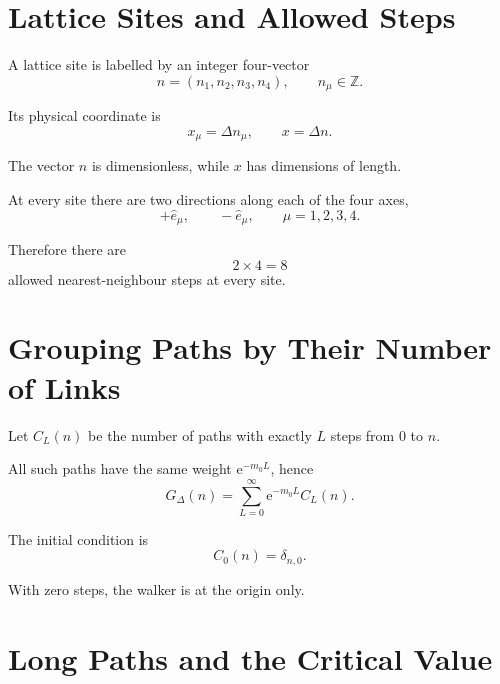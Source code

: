 \documentclass[11pt,a4paper,oneside]{article}
\newcommand{\ee}{\mathrm{e}}
\begin{document}
	\section{Lattice Sites and Allowed Steps}
	
	A lattice site is labelled by an integer four-vector
	\begin{equation}
		n=(n_1,n_2,n_3,n_4),
		\qquad
		n_\mu\in\mathbb{Z}.
	\end{equation}
	
	Its physical coordinate is
	\begin{equation}
		x_\mu=\Delta n_\mu,
		\qquad
		x=\Delta n.
		\label{eq:x-delta-n}
	\end{equation}
	
	The vector $n$ is dimensionless, while $x$ has dimensions of length.
	
	At every site there are two directions along each of the four axes,
	\[
	+\hat e_\mu,
	\qquad
	-\hat e_\mu,
	\qquad
	\mu=1,2,3,4.
	\]
	
	Therefore there are
	\[
	2\times4=8
	\]
	allowed nearest-neighbour steps at every site.
	
	
	\section{Grouping Paths by Their Number of Links}
	
	Let $C_L(n)$ be the number of paths with exactly $L$ steps from $0$ to $n$.
	
	All such paths have the same weight $\ee^{-m_0L}$, hence
	\begin{equation}
		\boxed{
			G_\Delta(n)
			=
			\sum_{L=0}^{\infty}
			\ee^{-m_0L}C_L(n).
		}
		\label{eq:G-C}
	\end{equation}
	
	The initial condition is
	\begin{equation}
		\boxed{
			C_0(n)=\delta_{n,0}.
		}
		\label{eq:initial-condition}
	\end{equation}
	
	With zero steps, the walker is at the origin only.
	
	
	\section{Long Paths and the Critical Value}
	
\end{document}
